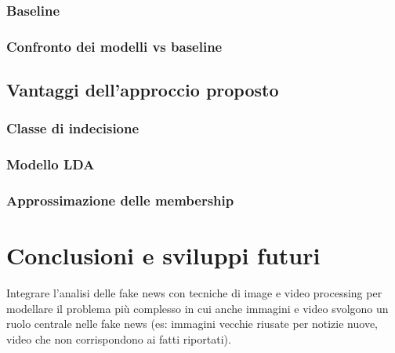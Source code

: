 \documentclass[12pt]{report}
\theoremstyle{definition}
\begin{document}
\subsection{Baseline}
\subsection{Confronto dei modelli vs baseline}
\section{Vantaggi dell'approccio proposto}
\subsection{Classe di indecisione}
\subsection{Modello LDA}
\subsection{Approssimazione delle membership}

\chapter*{Conclusioni e sviluppi futuri}
\onehalfspacing

Integrare l'analisi delle fake news con tecniche di image e video processing per modellare il problema più complesso in cui anche immagini e video svolgono un ruolo centrale nelle fake news (es: immagini vecchie riusate per notizie nuove, video che non corrispondono ai fatti riportati).

\printbibliography

%
\end{document}
